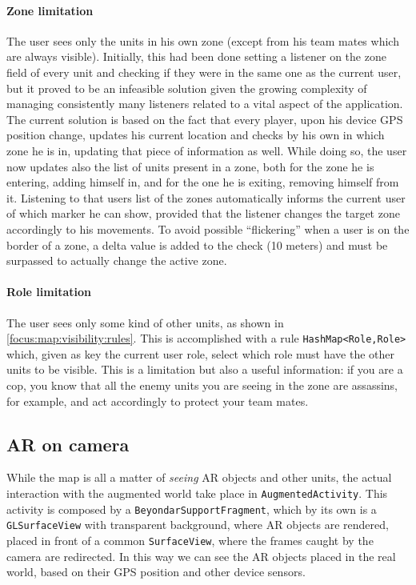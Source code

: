 				\paragraph{Zone limitation}
				
				The user sees only the units in his own zone (except from his team mates which are always visible). Initially, this had been done setting a listener on the zone field of every unit and checking if they were in the same one as the current user, but it proved to be an infeasible solution given the growing complexity of managing consistently many listeners related to a vital aspect of the application.
				The current solution is based on the fact that every player, upon his device GPS position change, updates his current location and checks by his own in which zone he is in, updating that piece of information as well.
				While doing so, the user now updates also the list of units present in a zone, both for the zone he is entering, adding himself in, and for the one he is exiting, removing himself from it.
				Listening to that users list of the zones automatically informs the current user of which marker he can show, provided that the listener changes the target zone accordingly to his movements.
				To avoid possible “flickering” when a user is on the border of a zone, a delta value is added to the check (10 meters) and must be surpassed to actually change the active zone.
				
				\paragraph{Role limitation}
				
				The user sees only some kind of other units, as shown in \autoref{focus:map:visibility:rules}.
				This is accomplished with a rule \lstinline|HashMap<Role,Role>| which, given as key the current user role, select which role must have the other units to be visible.
				This is a limitation but also a useful information: if you are a cop, you know that all the enemy units you are seeing in the zone are assassins, for example, and act accordingly to protect your team mates.
				
		\newpage
				
		\subsection{AR on camera}\label{focus:augmented}
			
		While the map is all a matter of \emph{seeing} AR objects and other units, the actual interaction with the augmented world take place in \lstinline|AugmentedActivity|.
		This activity is composed by a \lstinline|BeyondarSupportFragment|, which by its own is a \lstinline|GLSurfaceView| with transparent background, where AR objects are rendered, placed in front of a common \lstinline|SurfaceView|, where the frames caught by the camera are redirected. In this way we can see the AR objects placed in the real world, based on their GPS position and other device sensors.
		
